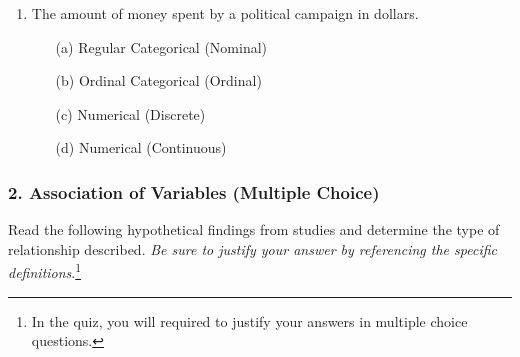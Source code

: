 \documentclass{article}
\begin{document}
\begin{enumerate}
    \item The amount of money spent by a political campaign in dollars.
    \begin{itemize}
        \item[(a)] Regular Categorical (Nominal)
        \item[(b)] Ordinal Categorical (Ordinal)
        \item[(c)] Numerical (Discrete)
        \item[(d)] Numerical (Continuous)
    \end{itemize}
    
\end{enumerate}

\subsubsection*{2. Association of Variables (Multiple Choice)}
Read the following hypothetical findings from studies and determine the type of relationship described. \emph{Be sure to justify your answer by referencing the specific definitions}.\footnote{In the quiz, you will required to justify your answers in multiple choice questions.}
\end{document}
